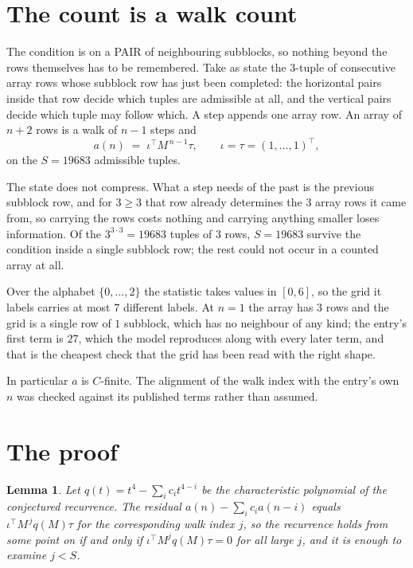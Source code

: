 \documentclass[11pt,a4paper]{article}
\theoremstyle{plain}
\newtheorem{lemma}[theorem]{Lemma}
\theoremstyle{definition}
\begin{document}
\section{The count is a walk count}

The condition is on a PAIR of neighbouring subblocks, so nothing beyond the
rows themselves has to be remembered. Take as state the $3$-tuple of consecutive array rows
whose subblock row has just been completed: the horizontal pairs inside that row decide which
tuples are admissible at all, and the vertical pairs decide which tuple may follow which. A
step appends one array row. An array of $n+2$ rows is a walk of $n-1$ steps and
\[
a(n)\;=\;\iota^{\!\top}M^{\,n-1}\tau,\qquad\iota=\tau=(1,\dots,1)^{\!\top},
\]
on the $S=19683$ admissible tuples.

The state does not compress. What a step needs of the past is the previous subblock row, and
for $3\ge3$ that row already determines the $3$ array rows it came from, so carrying the
rows costs nothing and carrying anything smaller loses information. Of the $3^{3\cdot
3}=19683$ tuples of $3$ rows, $S=19683$ survive the condition inside a single subblock row;
the rest could not occur in a counted array at all.

Over the alphabet $\{0,\dots,2\}$ the statistic takes values in $[0,6]$, so the
grid it labels carries at most $7$ different labels. At $n=1$ the array has $3$
rows and the grid is a single row of $1$
subblock, which has no neighbour of any kind; the entry's first term is
$27$, which the model reproduces along with every later term, and that is the cheapest
check that the grid has been read with the right shape.

In particular $a$ is $C$-finite. The alignment of the walk index with the entry's own $n$ was
checked against its published terms rather than assumed.

\section{The proof}

\begin{lemma}\label{lem:crit}
Let $q(t)=t^{4}-\sum_i c_it^{4-i}$ be the characteristic polynomial of the
conjectured recurrence. The residual $a(n)-\sum_ic_ia(n-i)$ equals
$\iota^{\!\top}M^{\,j}q(M)\tau$ for the corresponding walk index $j$, so the recurrence
holds from some point on if and only if $\iota^{\!\top}M^{j}q(M)\tau=0$ for all large $j$,
and it is enough to examine $j<S$.
\end{lemma}
\end{document}
